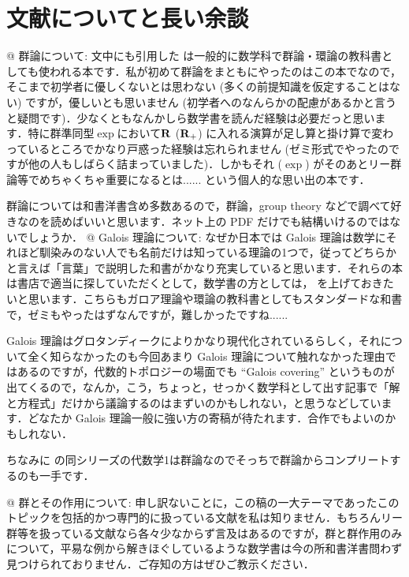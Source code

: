 \documentclass[11pt]{jsarticle}
\begin{document}
\section*{文献についてと長い余談}
\begin{easylist}[itemize]
  @ 群論について: 文中にも引用した \cite{katura} は一般的に数学科で群論・環論の教科書としても使われる本です．私が初めて群論をまともにやったのはこの本でなので，そこまで初学者に優しくないとは思わない (多くの前提知識を仮定することはない) ですが，優しいとも思いません (初学者へのなんらかの配慮があるかと言うと疑問です)．少なくともなんかしら数学書を読んだ経験は必要だっと思います．特に群準同型$\exp$において$\operatorname{\mathbf{R}}$ ($\operatorname{\mathbf{R}}_+$) に入れる演算が足し算と掛け算で変わっているところでかなり戸惑った経験は忘れられません (ゼミ形式でやったのですが他の人もしばらく詰まっていました)．しかもそれ ($\exp$) がそのあとリー群論等でめちゃくちゃ重要になるとは...... という個人的な思い出の本です．

  群論については和書洋書含め多数あるので，群論，group theory などで調べて好きなのを読めばいいと思います．ネット上の PDF だけでも結構いけるのではないでしょうか．
  @ Galois 理論について: なぜか日本では Galois 理論は数学にそれほど馴染みのない人でも名前だけは知っている理論の1つで，従ってどちらかと言えば「言葉」で説明した和書がかなり充実していると思います．それらの本は書店で適当に探していただくとして，数学書の方としては，\cite{yukie} を上げておきたいと思います．こちらもガロア理論や環論の教科書としてもスタンダードな和書で，ゼミもやったはずなんですが，難しかったですね...... 

  Galois 理論はグロタンディークによりかなり現代化されているらしく，それについて全く知らなかったのも今回あまり Galois 理論について触れなかった理由ではあるのですが，代数的トポロジーの場面でも ``Galois covering'' というものが出てくるので，なんか，こう，ちょっと，せっかく数学科として出す記事で「解と方程式」だけから議論するのはまずいのかもしれない，と思うなどしています．どなたか Galois 理論一般に強い方の寄稿が待たれます．合作でもよいのかもしれない．

  ちなみに \cite{yukie} の同シリーズの代数学1は群論なのでそっちで群論からコンプリートするのも一手です．

  @ 群とその作用について: 申し訳ないことに，この稿の一大テーマであったこのトピックを包括的かつ専門的に扱っている文献を私は知りません．もちろんリー群等を扱っている文献なら各々少なからず言及はあるのですが，群と群作用のみについて，平易な例から解きほぐしているような数学書は今の所和書洋書問わず見つけられておりません．ご存知の方はぜひご教示ください．


\end{easylist}
\end{document}
